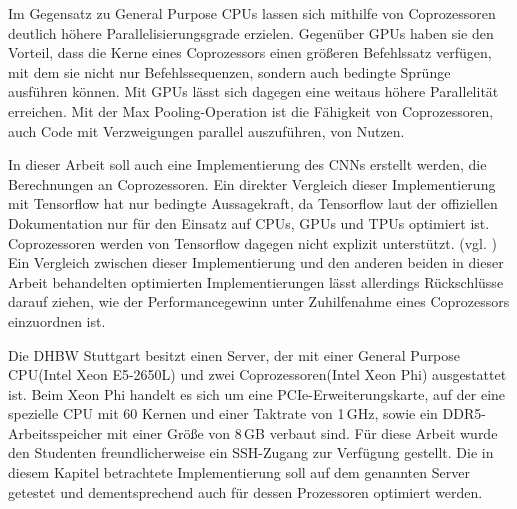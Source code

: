 \documentclass[../main.tex]{subfiles}
\begin{document}
Im Gegensatz zu General Purpose CPUs lassen sich mithilfe von Coprozessoren deutlich höhere Parallelisierungsgrade erzielen. Gegenüber GPUs haben sie den Vorteil, dass die Kerne eines Coprozessors einen größeren Befehlssatz verfügen, mit dem sie nicht nur Befehlssequenzen, sondern auch bedingte Sprünge ausführen können. Mit GPUs lässt sich dagegen eine weitaus höhere Parallelität erreichen. Mit der Max Pooling-Operation ist die Fähigkeit von Coprozessoren, auch Code mit Verzweigungen parallel auszuführen, von Nutzen. 

In dieser Arbeit soll auch eine Implementierung des CNNs erstellt werden, die Berechnungen an Coprozessoren. Ein direkter Vergleich dieser Implementierung mit Tensorflow hat nur bedingte Aussagekraft, da Tensorflow laut der offiziellen Dokumentation nur für den Einsatz auf CPUs, GPUs und TPUs optimiert ist. Coprozessoren werden von Tensorflow dagegen nicht explizit unterstützt. (vgl. \cite{aboutTensorflow}) Ein Vergleich zwischen dieser Implementierung und den anderen beiden in dieser Arbeit behandelten optimierten Implementierungen lässt allerdings Rückschlüsse darauf ziehen, wie der Performancegewinn unter Zuhilfenahme eines Coprozessors einzuordnen ist. 

Die DHBW Stuttgart besitzt einen Server, der mit einer General Purpose CPU(Intel Xeon E5-2650L) und zwei Coprozessoren(Intel Xeon Phi) ausgestattet ist. Beim Xeon Phi handelt es sich um eine PCIe-Erweiterungskarte, auf der eine spezielle CPU mit 60 Kernen und einer Taktrate von 1\,GHz, sowie ein DDR5-Arbeitsspeicher mit einer Größe von 8\,GB verbaut sind. Für diese Arbeit wurde den Studenten freundlicherweise ein SSH-Zugang zur Verfügung gestellt. Die in diesem Kapitel betrachtete Implementierung soll auf dem genannten Server getestet und dementsprechend auch für dessen Prozessoren optimiert werden. 
\end{document}
